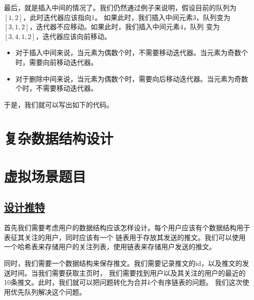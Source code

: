 \documentclass[../../main.tex]{subfiles}
\begin{document}

最后，就是插入中间的情况了。我们仍然通过例子来说明，假设目前的队列为$[1,2]$，此时迭代器应该指向1。
如果此时，我们插入中间元素$3$，队列变为$[3,1,2]$，迭代器不应移动。如果此时，我们插入中间元素$4$，队列
变为$[3,4,1,2]$，迭代器应该向前移动。

\begin{itemize}
  \item 对于插入中间来说，当元素为偶数个时，不需要移动迭代器。当元素为奇数个时，需要向前移动迭代器。
  \item 对于删除中间来说，当元素为偶数个时，需要向后移动迭代器。当元素为奇数个时，不需要移动迭代器。
\end{itemize}

于是，我们就可以写出如下的代码。



\section{复杂数据结构设计}

\section{虚拟场景题目}

\subsection{\href{https://leetcode.cn/problems/design-twitter/}{设计推特}}

首先我们需要考虑用户的数据结构应该怎样设计。每个用户应该有个数据结构用于表征其关注的用户，同时应该有一个
链表用于存放其发送的推文。我们可以使用一个哈希表来存储用户的关注列表，使用链表来存储用户发送的推文。

同时，我们需要一个数据结构来保存推文。我们需要记录推文的id，以及推文的发送时间。当我们需要获取主页时，
我们需要找到用户以及其关注的用户的最近的10条推文。此时，我们就可以把问题转化为合并$k$个有序链表的问题。
我们这次使用优先队列解决这个问题。
\end{document}
